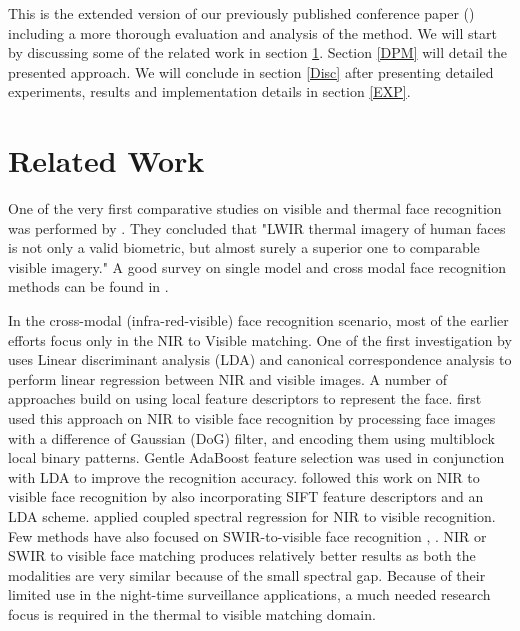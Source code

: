 \documentclass[smallextended,natbib]{svjour3}       \usepackage{graphicx}
\begin{document}
This is the extended version of our previously published conference paper (\cite{sarfraz2015}) including a more thorough evaluation and analysis of the method. We will start by discussing some of the related work in section \ref{related}. Section \ref{DPM} will detail the presented approach. We will conclude in section \ref{Disc} after presenting detailed experiments, results and implementation details in section \ref{EXP}. 

\section{Related Work}
\label{related}
One of the very first comparative studies on visible and thermal face recognition was performed by \cite{socolinsky2002}. They concluded that "LWIR thermal imagery of human faces is not only a valid biometric,  but almost surely a superior one to comparable visible imagery." A good survey on single model and cross modal face recognition methods can be found in \cite{zhou2014recent}.

In the cross-modal (infra-red-visible) face recognition scenario, most of the earlier efforts focus only in the NIR to Visible matching. One of the first investigation by \cite{yi2007} uses Linear discriminant analysis (LDA) and canonical correspondence analysis to perform linear regression between NIR and visible images. A number of approaches build on using local feature descriptors to represent the face.   \cite{liao2009} first used this approach on NIR to visible face recognition by processing face images with a difference of Gaussian (DoG) filter, and encoding them using multiblock local binary patterns. Gentle AdaBoost feature selection was used in conjunction with LDA to improve the recognition accuracy. \cite{Klare2010} followed this work on NIR to visible face recognition by also incorporating SIFT feature descriptors and an LDA scheme. \cite{lei2009} applied coupled spectral regression for NIR to visible recognition. Few methods have also focused on SWIR-to-visible face recognition \cite{ross2010}, \cite{nicolo2012}. NIR or SWIR to visible face matching produces relatively better results as both the modalities are very similar because of the small spectral gap. Because of their limited use in the night-time surveillance applications, a much needed research focus is required in the thermal to visible matching domain.
\end{document}
